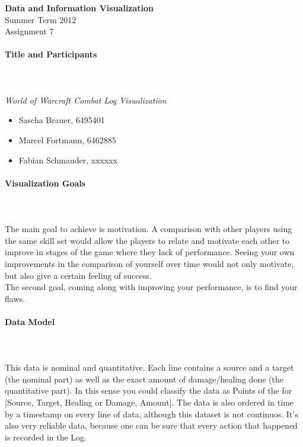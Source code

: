 \documentclass{scrartcl}
\begin{document}
\begin{center}
{\huge \textbf{Data and Information Visualization}}\\
Summer Term 2012\\
Assignment 7
\end{center}

\paragraph{Title and Participants}
\hfill \\ \hfill \\
\textit{World of Warcraft Combat Log Visualization}\\
\begin{itemize}
\item Sascha Brauer, 6495401
\item Marcel Fortmann, 6462885
\item Fabian Schmauder, xxxxxx
\end{itemize}

\paragraph{Visualization Goals}
\hfill \\ \hfill \\
The main goal to achieve is motivation. A comparison with other players using the same skill set would allow the players to relate and motivate each other to improve in stages of the game where they lack of performance. Seeing your own improvements in the comparison of yourself over time would not only motivate, but also give a certain feeling of success.\\
The second goal, coming along with improving your performance, is to find your flaws.

\paragraph{Data Model}
\hfill \\ \hfill \\
This data is nominal and quantitative. Each line contains a source and a target (the nominal part) as well as the exact amount of damage/healing done (the quantitative part). In this sense you could classify the data as Points of the for [Source, Target, Healing or Damage, Amount]. The data is also ordered in time by a timestamp on every line of data, although this dataset is not continuos. It's also very reliable data, because one can be sure that every action that happened is recorded in the Log. 
\end{document}
